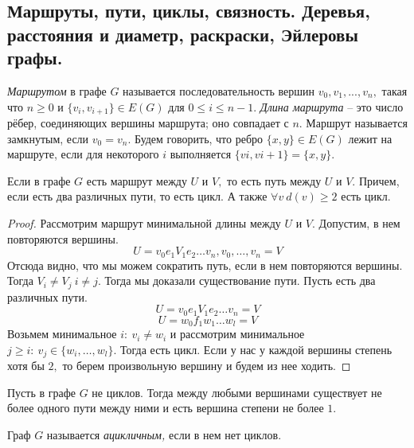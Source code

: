 
\subsection{Маршруты, пути, циклы, связность. Деревья, расстояния и диаметр, раскраски, Эйлеровы графы.}

\begin{definition}
        \textit{Маршрутом} в графе $G$ называется последовательность вершин $v_0, v_1, . . . , v_n,$ такая что $n \geq 0$ и $\{v_i, v_{i+1}\} \in E(G)$ для $ 0 \leq i \leq n - 1.$ \textit{Длина маршрута} -- это число рёбер, соединяющих вершины маршрута; оно совпадает с $n.$ Маршрут называется замкнутым, если $v_0 = v_n.$ Будем говорить, что ребро $\{x, y\} \in E(G)$ лежит на маршруте, если для некоторого $i$ выполняется $\{vi, vi+1\} = \{x, y\}.$
\end{definition}

\begin{lemma}
    Если в графе $G$ есть маршрут между $U$ и $V,$ то есть путь между $U$ и $V.$ Причем, если есть два различных пути, то есть цикл. А также $\forall v \ d(v) \geq 2 \text{ есть цикл.}$
\end{lemma}
\begin{proof}
    Рассмотрим маршрут минимальной длины между $U$ и $V.$ Допустим, в нем повторяются вершины.
    $$U=v_0e_1V_1e_2\dots v_n, v_0, \dots, v_n = V$$
    Отсюда видно, что мы можем сократить путь, если в нем повторяются вершины. Тогда $V_i \neq V_j \  i \neq j.$
    Тогда мы доказали существование пути. Пусть есть два различных пути. 
    $$U=v_0e_1V_1e_2\dots v_n = V$$
    $$U=w_0f_1w_1\dots w_l = V$$
    Возьмем минимальное $i: \ v_i \neq w_i$ и рассмотрим минимальное $j \geq i: \ v_j \in \{ w_i, \dots, w_l \}.$ Тогда есть цикл. Если у нас у каждой вершины степень хотя бы $2,$ то берем произвольную вершину и будем из нее ходить.
\end{proof}


\begin{lemma}
    Пусть в графе $G$ не циклов. Тогда между любыми вершинами существует не более одного пути между ними и есть вершина степени не более $1.$ 
\end{lemma}

\begin{definition}
    Граф $G$ называется \textit{ацикличным,} если в нем нет циклов.
\end{definition}

